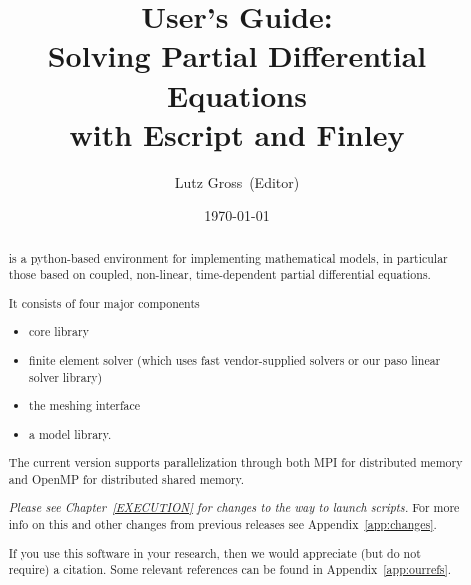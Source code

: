 \documentclass{esysdoc}
\title{\module{esys} User's Guide:\\ Solving Partial Differential Equations\\ with Escript and Finley}
\author{Lutz Gross\etal~(Editor)}
\date{\today}
\begin{document}
\maketitle

\ifpdf
{}
\fi



\begin{abstract}
\escript is a python-based environment for implementing mathematical models, in particular those based on coupled, non-linear, time-dependent partial differential equations.

It consists of four major components
\begin{itemize}
\item \escript core library
\item finite element solver \finley (which uses fast vendor-supplied solvers or our paso linear solver library)
\item the meshing interface \pycad
\item a model library.
\end{itemize}
The current version supports parallelization through both MPI for distributed memory and OpenMP for distributed shared memory.

\emph{Please see Chapter~\ref{EXECUTION} for changes to the way to launch \escript scripts.}
For more info on this and other changes from previous releases see Appendix~\ref{app:changes}.

If you use this software in your research, then we would appreciate (but do not require) a citation.
Some relevant references can be found in Appendix~\ref{app:ourrefs}.
\end{abstract}

\tableofcontents








\esysappendix %

%

%



\end{document}
